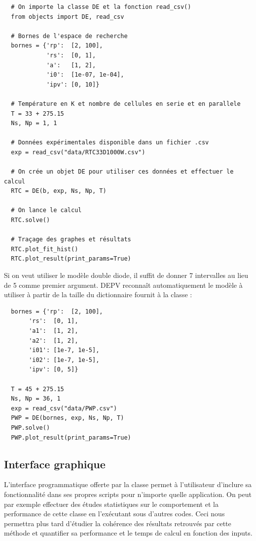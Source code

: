 \begin{verbatim}
  # On importe la classe DE et la fonction read_csv()
  from objects import DE, read_csv

  # Bornes de l'espace de recherche
  bornes = {'rp':  [2, 100],
            'rs':  [0, 1],
            'a':   [1, 2],
            'i0':  [1e-07, 1e-04],
            'ipv': [0, 10]}
  
  # Température en K et nombre de cellules en serie et en parallele
  T = 33 + 275.15
  Ns, Np = 1, 1

  # Données expérimentales disponible dans un fichier .csv
  exp = read_csv("data/RTC33D1000W.csv")

  # On crée un objet DE pour utiliser ces données et effectuer le calcul
  RTC = DE(b, exp, Ns, Np, T)

  # On lance le calcul
  RTC.solve()

  # Traçage des graphes et résultats
  RTC.plot_fit_hist()
  RTC.plot_result(print_params=True)
\end{verbatim}
Si on veut utiliser le modèle double diode, il suffit de donner 7 intervalles au lieu de 5 comme premier argument. DEPV reconnaît automatiquement le modèle à utiliser à partir de la taille du dictionnaire  fournit à la classe :
\begin{verbatim}
  bornes = {'rp':  [2, 100],
       'rs':  [0, 1],
       'a1':  [1, 2],
       'a2':  [1, 2],
       'i01': [1e-7, 1e-5],
       'i02': [1e-7, 1e-5],
       'ipv': [0, 5]}
       
  T = 45 + 275.15
  Ns, Np = 36, 1
  exp = read_csv("data/PWP.csv")
  PWP = DE(bornes, exp, Ns, Np, T)
  PWP.solve()
  PWP.plot_result(print_params=True)
\end{verbatim}


\subsection{Interface graphique}
L'interface programmatique offerte par la classe  permet à l'utilisateur d'inclure sa fonctionnalité dans ses propres scripts pour n'importe quelle application. On peut par exemple effectuer des études statistiques sur le comportement et la performance de cette classe en l'exécutant sous d'autres codes. Ceci nous permettra plus tard d'étudier la cohérence des résultats retrouvés par cette méthode et quantifier sa performance et le temps de calcul en fonction des inputs.

